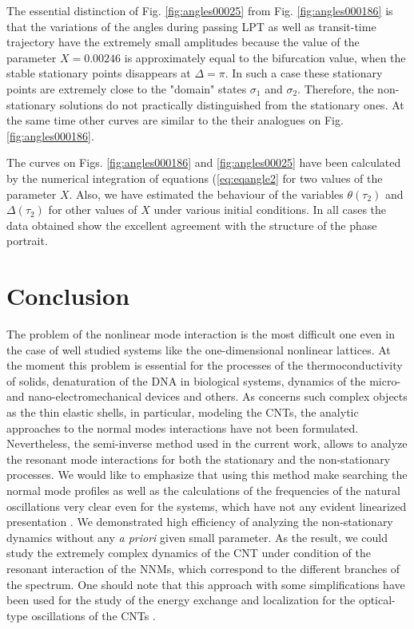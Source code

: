 The essential distinction of  Fig. \ref{fig:angles00025} from Fig. \ref{fig:angles000186} is that the variations of the angles during passing LPT as well as transit-time trajectory have the extremely small amplitudes because the value of the parameter $X=0.00246$ is approximately equal to the bifurcation value, when the stable stationary points disappears at $\Delta=\pi$.
In such a case these stationary points are extremely close to the "domain" states $\sigma_{1}$ and $\sigma_{2}$.
Therefore, the non-stationary solutions do not practically distinguished from the stationary ones.
At the same time other curves are similar to the their analogues on Fig. \ref{fig:angles000186}.

The curves on Figs. \ref{fig:angles000186} and \ref{fig:angles00025} have been calculated by the numerical integration of equations (\ref{eq:eqangle2} for two values of the parameter $X$.
Also, we have estimated the behaviour of the variables $\theta(\tau_{2})$ and $\Delta(\tau_{2})$  for other values of $X$ under various initial conditions.
In all cases the data obtained  show the excellent agreement with the structure of the phase portrait.



\section{Conclusion}

The problem of the nonlinear mode interaction is the most difficult one even in the case of well studied systems like the one-dimensional nonlinear lattices.
At the moment this problem is essential for the processes of the thermoconductivity of solids, denaturation of the DNA in biological systems, dynamics of the micro- and nano-electromechanical devices and others.
As concerns such complex objects as the thin elastic shells, in particular, modeling the CNTs, the analytic approaches to the normal modes interactions have not been formulated.
Nevertheless, the semi-inverse method used in the current work, allows to analyze the resonant mode interactions  for both the stationary and  the non-stationary processes.
We would like to emphasize that using this method make searching the normal mode profiles as well as the calculations of the frequencies of the natural oscillations very clear even for the systems, which have not any evident linearized presentation \cite{Zhang2016,Smirnov2017}.
We demonstrated high efficiency of analyzing the non-stationary dynamics without any \textit{a priori} given small parameter.
As the result, we could study the extremely complex dynamics of the CNT under condition of the resonant interaction of the NNMs, which correspond to the different branches of the spectrum.
One should note that this approach with some simplifications have been used for the study of the energy exchange and localization for the optical-type oscillations of the CNTs \cite{Smirnov2014,Smirnov2016PhysD}.

